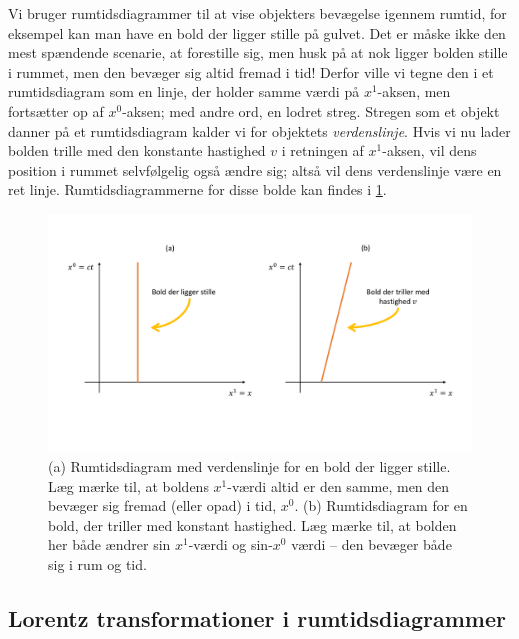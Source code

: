 \documentclass[crop=false, class=memoir]{standalone}
\begin{document}
Vi bruger rumtidsdiagrammer til at vise objekters bevægelse igennem rumtid, for eksempel kan man have en bold der ligger stille på gulvet. Det er måske ikke den mest spændende scenarie, at forestille sig, men husk på at nok ligger bolden stille i rummet, men den bevæger sig altid fremad i tid! Derfor ville vi tegne den i et rumtidsdiagram som en linje, der holder samme værdi på $x^1$-aksen, men fortsætter op af $x^0$-aksen; med andre ord, en lodret streg. Stregen som et objekt danner på et rumtidsdiagram kalder vi for objektets \emph{verdenslinje}. Hvis vi nu lader bolden trille med den konstante hastighed $v$ i retningen af $x^1$-aksen, vil dens position i rummet selvfølgelig også ændre sig; altså vil dens verdenslinje være en ret linje. Rumtidsdiagrammerne for disse bolde kan findes i \cref{rel:fig:ball}.

\begin{figure}
    \centering
    \includegraphics[trim = 0 100 0 0, clip, width = \textwidth]{Rel/Billeder/Ball_diagram.pdf}
    \caption{(a) Rumtidsdiagram med verdenslinje for en bold der ligger stille. Læg mærke til, at boldens $x^1$-værdi altid er den samme, men den bevæger sig fremad (eller opad) i tid, $x^0$. (b) Rumtidsdiagram for en bold, der triller med konstant hastighed. Læg mærke til, at bolden her både ændrer sin $x^1$-værdi og sin-$x^0$ værdi -- den bevæger både sig i rum og tid.}
    \label{rel:fig:ball}
\end{figure}

\subsection{Lorentz transformationer i rumtidsdiagrammer}
\end{document}
